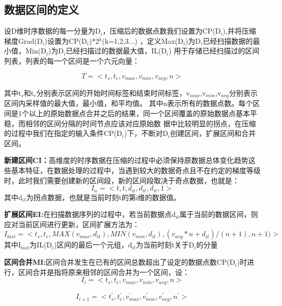 \subsection{数据区间的定义}
\label{sectoin 3.13}

设D维时序数据的每一分量为D$_{i}$，压缩后的数据点数我们设置为CP(D$_{i}$),并将压缩梯度Grad(D$_{i}$)设置为CP(D$_{i}$)*2$^{k}$(k=1,2,3...)
，定义Max(D$_{i}$)为D$_{i}$已经扫描数据的最小值，Min(D$_{i}$)为D$_{i}$已经扫描过的数据最大值，IL(D$_{i}$)
用于存储已经扫描过的区间列表，列表的每一个区间是一个六元向量：


\begin{equation}
T=<t_{s},t_{e},v_{max},v_{min},v_{avg},n>
\end{equation}


其中t$_{s}$和t$_{e}$分别表示区间的开始时间标签和结束时间标签，v$_{max}$,v$_{min}$,v$_{avg}$分别表示区间内采样值的最大值，最小值，和平均值。
其中n表示所有的数据点数。每个区间是1个以上的原始数据点合并之后的结果，同一个区间覆盖的原始数据点基本平稳，而相邻的区间分隔的时间节点应该对应原始数
据中比较明显的拐点，在压缩的过程中我们在指定的输入条件CP(D$_{i}$)下，不断对D$_{i}$创建区间，扩展区间和合并区间。


\textbf{新建区间CI：}高维度的时序数据在压缩的过程中必须保持原数据总体变化趋势这些基本特征，在数据处理的过程中，当遇到较大的数据奇点且不在约定的梯度等级时，此时我们需要创建新的区间段，新的区间段取决于奇点数据，也就是：
\begin{equation}
I_{n}=<t,t,d_{it},d_{it},d_{it},1>
\end{equation}
其中d$_{it}$为拐点数据，也就是当前时刻t的第i维的数据值。

\textbf{扩展区间EI:}在扫描数据序列的过程中，若当前数据点d$_{it}$属于当前的数据区间，则应对当前区间进行更新，区间扩展方法为：
\begin{equation}
I_{last}=<t_{s},t_{e},MAX(v_{max},d_{it}),MIN(v_{min},d_{it}),(v_{avg}*n+d_{it})/(n+1),n+1)>
\end{equation}
其中I$_{last}$为IL(D$_{i}$)区间的最后一个元组，d$_{it}$为当前时刻t关于D$_{i}$的分量


\textbf{区间合并MI:}区间合并发生在已有的区间总数超出了设定的数据点数CP(D$_{i}$)时进行，区间合并是指将原来相邻的区间合并为一个区间，设：
\begin{equation}
I_{i}=<t_{s},t_{e},v_{max},v_{min},v_{avg},n>
\end{equation}


\begin{equation}
I_{i+1}=<t_{s}^{'},t_{e}^{'},v_{max}^{'},v_{min}^{'},v_{avg}^{'},n^{'}>
\end{equation}

